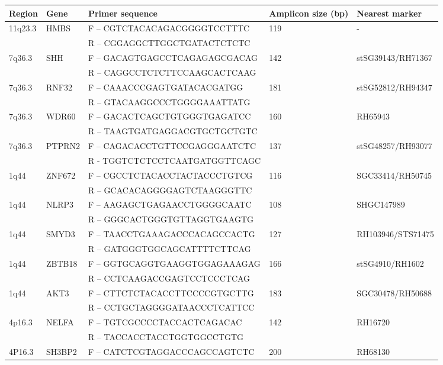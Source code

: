 \begin{longtabu}{ l l l l l}
\toprule
 Region & Gene & Primer sequence & Amplicon size (bp) & Nearest marker  \\* \midrule
 11q23.3 & HMBS & F – CGTCTACACAGACGGGGTCCTTTC & 119 & - \\* \midrule
  &  & R – CGGAGGCTTGGCTGATACTCTCTC  &  &  \\* \midrule
 7q36.3 & SHH & F – GACAGTGAGCCTCAGAGAGCGACAG & 142 & stSG39143/RH71367 \\* \midrule
  &  & R – CAGGCCTCTCTTCCAAGCACTCAAG  &  &  \\* \midrule
 7q36.3 & RNF32 & F – CAAACCCGAGTGATACACGATGG & 181 & stSG52812/RH94347 \\* \midrule
  &  & R – GTACAAGGCCCTGGGGAAATTATG  &  &  \\* \midrule
 7q36.3 & WDR60 & F – GACACTCAGCTGTGGGTGAGATCC & 160 & RH65943 \\* \midrule
  &  & R – TAAGTGATGAGGACGTGCTGCTGTC  &  &  \\* \midrule
 7q36.3 & PTPRN2 & F – CAGACACCTGTTCCGAGGGAATCTC & 137 & stSG48257/RH93077 \\* \midrule
  &  & R - TGGTCTCTCCTCAATGATGGTTCAGC &  &  \\* \midrule
 1q44 & ZNF672 & F – CGCCTCTACACCTACTACCCTGTCG & 116 & SGC33414/RH50745 \\* \midrule
  &  & R – GCACACAGGGGAGTCTAAGGGTTC  &  &  \\* \midrule
 1q44 & NLRP3 & F – AAGAGCTGAGAACCTGGGGCAATC & 108 & SHGC147989 \\* \midrule
  &  & R – GGGCACTGGGTGTTAGGTGAAGTG &  &  \\* \midrule
 1q44 & SMYD3 & F – TAACCTGAAAGACCCACAGCCACTG & 127 & RH103946/STS71475 \\* \midrule
  &  & R – GATGGGTGGCAGCATTTTCTTCAG &  &  \\* \midrule
 1q44 & ZBTB18 & F – GGTGCAGGTGAAGGTGGAGAAAGAG & 166 & stSG4910/RH1602 \\* \midrule
  &  & R – CCTCAAGACCGAGTCCTCCCTCAG &  &  \\* \midrule
 1q44 & AKT3 & F – CTTCTCTACACCTTCCCCGTGCTTG & 183 & SGC30478/RH50688 \\* \midrule
  &  & R – CCTGCTAGGGGATAACCCTCATTCC &  &  \\* \midrule
 4p16.3 & NELFA & F – TGTCGCCCCTACCACTCAGACAC & 142 & RH16720 \\* \midrule
  &  & R – TACCACCTACCTGGTGGCCTGTG &  &  \\* \midrule
 4P16.3 & SH3BP2 & F – CATCTCGTAGGACCCAGCCAGTCTC & 200 & RH68130 \\* \midrule

\end{longtabu}
